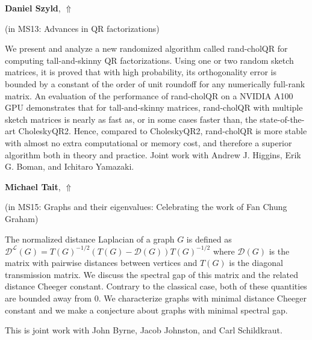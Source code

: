 \documentclass[ILAS2025-program.tex]{subfiles}
\begin{document}
\hypertarget{down0339}{}\begin{ilasabstract}
    
\textbf{Daniel Szyld},  \hfill \hyperlink{up0339}{$\Uparrow$}
    
    
(in {\color{mstitle}MS13: Advances in QR factorizations})
        
\mtskip
    We present and analyze a new randomized algorithm called rand-cholQR
for computing tall-and-skinny QR factorizations.
Using one or two random sketch matrices, it is  proved that with
high probability, its orthogonality error is bounded by a constant
of the order of unit roundoff for any numerically full-rank matrix.
An evaluation of the performance of rand-cholQR on a NVIDIA A100 GPU
demonstrates that for tall-and-skinny matrices, rand-cholQR with
multiple sketch matrices is nearly as fast as, or in some cases faster
than, the state-of-the-art CholeskyQR2. Hence, compared to CholeskyQR2,
rand-cholQR is more stable with almost no extra computational or
memory cost, and therefore a superior algorithm both in theory and practice.
Joint work with Andrew J. Higgins, Erik G. Boman, and Ichitaro Yamazaki.

\end{ilasabstract}
    

\hypertarget{down0061}{}\begin{ilasabstract}
    
\textbf{Michael Tait},  \hfill \hyperlink{up0061}{$\Uparrow$}
    
    
(in {\color{mstitle}MS15: Graphs and their eigenvalues: Celebrating the work of Fan Chung Graham})
        
\mtskip
    The normalized distance Laplacian of a graph $G$ is defined as $\mathcal{D}^\mathcal{L}(G)=T(G)^{-1/2}(T(G)-\mathcal{D}(G))T(G)^{-1/2}$ where $\mathcal{D}(G)$ is the matrix with pairwise distances between vertices and $T(G)$ is the diagonal transmission matrix. We discuss the spectral gap of this matrix and the related distance Cheeger constant. Contrary to the classical case, both of these quantities are bounded away from $0$. We characterize graphs with minimal distance Cheeger constant and we make a conjecture about graphs with minimal spectral gap. 
 
This is joint work with John Byrne, Jacob Johnston, and Carl Schildkraut.
\end{ilasabstract}
    
\end{document}
